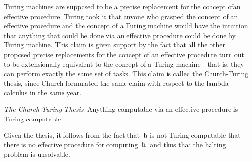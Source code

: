 \documentclass[../../include/open-logic-section]{subfiles}
\begin{document}

Turing machines are supposed to be a precise replacement for the concept
ofan effective procedure. Turing took it that anyone who grasped the
concept
of an effective procedure and the concept of a Turing machine would have
the intuition that anything that could be done via an effective procedure
could be done by Turing machine. This claim is given support by the fact
that all the other proposed precise replacements for the concept of an
effective procedure turn out to be extensionally equivalent to the concept
of a Turing machine---that is, they can perform exactly the same set of
tasks. This claim is called the Church-Turing thesis, since Church
formulated the same claim with respect to the lambda calculus in the same
year.

\begin{defn}
\emph{The Church-Turing Thesis}: Anything computable via an effective
procedure is Turing-computable.
\end{defn}

Given the thesis, it follows from the fact that~$\mathrm{h}$ is not
Turing-computable that there is no effective procedure for
computing~$\mathrm{h}$, and thus that the halting problem is unsolvable.
\end{document}
